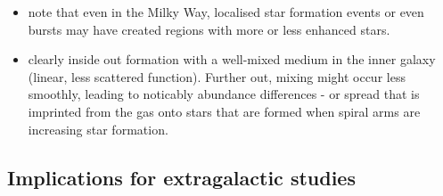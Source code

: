 \documentclass[fleqn,usenatbib]{mnras}
\begin{document}
\begin{itemize}
\item note that even in the Milky Way, localised star formation events or even bursts \citep{Sanchez2014, SanchezBlazquez2014, Ho2015} may have created regions with more or less enhanced stars. 
\item clearly inside out formation with a well-mixed medium in the inner galaxy (linear, less scattered function). Further out, mixing might occur less smoothly, leading to noticably abundance differences - or spread that is imprinted from the gas onto stars that are formed when spiral arms are increasing star formation.
\end{itemize}

\subsection{Implications for extragalactic studies} \label{sec:implications_extragalactic}
\end{document}
